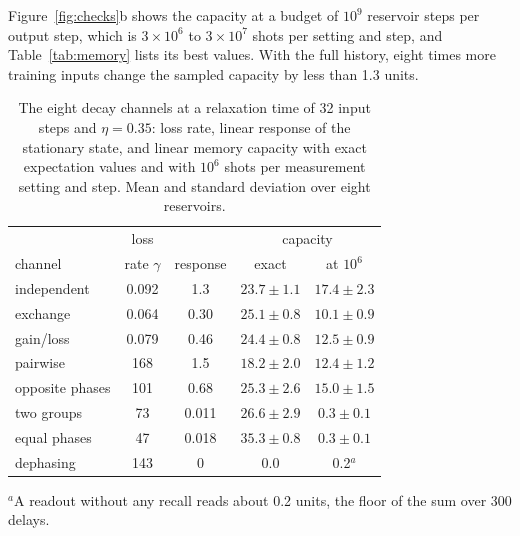 Figure~\ref{fig:checks}b shows the capacity at a budget of $10^9$ reservoir steps per output step, which is
$3\times10^6$ to $3\times10^7$ shots per setting and step, and Table~\ref{tab:memory} lists its best values.
With the full history, eight times more
training inputs change the sampled capacity by less than 1.3 units.

\begin{table}[!t]
\caption{\label{tab:matched}The eight decay channels at a relaxation time of 32 input steps and $\eta=0.35$:
loss rate, linear response of the stationary state, and linear memory capacity with exact expectation values and with
$10^6$ shots per measurement
setting and step. Mean and standard deviation over eight reservoirs.}
\centering\footnotesize\setlength{\tabcolsep}{3.5pt}
\begin{tabular}{@{}lcccc@{}}
\toprule
 & loss & & \multicolumn{2}{c}{capacity}\\
channel & rate $\gamma$ & response & exact & at $10^6$\\\midrule
independent & 0.092 & 1.3 & $23.7\pm1.1$ & $17.4\pm2.3$\\
exchange & 0.064 & 0.30 & $25.1\pm0.8$ & $10.1\pm0.9$\\
gain/loss & 0.079 & 0.46 & $24.4\pm0.8$ & $12.5\pm0.9$\\
pairwise & 168 & 1.5 & $18.2\pm2.0$ & $12.4\pm1.2$\\
opposite phases & 101 & 0.68 & $25.3\pm2.6$ & $15.0\pm1.5$\\
two groups & 73 & 0.011 & $26.6\pm2.9$ & $0.3\pm0.1$\\
equal phases & 47 & 0.018 & $35.3\pm0.8$ & $0.3\pm0.1$\\
dephasing & 143 & 0 & 0.0 & 0.2$^{a}$\\
\bottomrule
\end{tabular}

\smallskip
\raggedright\footnotesize
$^{a}$A readout without any recall reads about 0.2 units, the floor of the sum over 300 delays.
\end{table}

